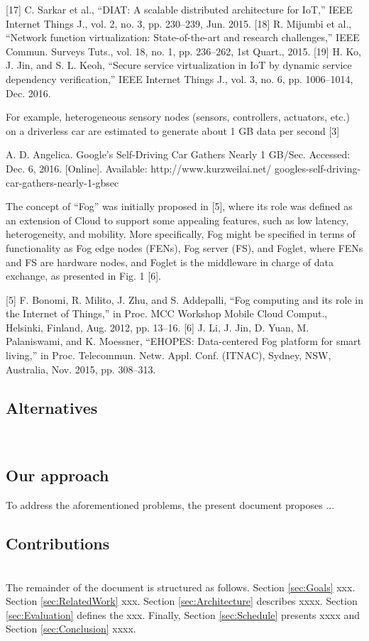 [17] C. Sarkar et al., “DIAT: A scalable distributed architecture for IoT,”
IEEE Internet Things J., vol. 2, no. 3, pp. 230–239, Jun. 2015.
[18] R. Mijumbi et al., “Network function virtualization: State-of-the-art
and research challenges,” IEEE Commun. Surveys Tuts., vol. 18, no. 1,
pp. 236–262, 1st Quart., 2015.
[19] H. Ko, J. Jin, and S. L. Keoh, “Secure service virtualization in IoT
by dynamic service dependency verification,” IEEE Internet Things J.,
vol. 3, no. 6, pp. 1006–1014, Dec. 2016.

For example, heterogeneous sensory
nodes (sensors, controllers, actuators, etc.) on a driverless car
are estimated to generate about 1 GB data per second [3]

A. D. Angelica. Google’s Self-Driving Car Gathers Nearly 1 GB/Sec.
Accessed: Dec. 6, 2016. [Online]. Available: http://www.kurzweilai.net/
googles-self-driving-car-gathers-nearly-1-gbsec


The concept of “Fog” was initially proposed in [5], where
its role was defined as an extension of Cloud to support some
appealing features, such as low latency, heterogeneity, and
mobility. More specifically, Fog might be specified in terms
of functionality as Fog edge nodes (FENs), Fog server (FS),
and Foglet, where FENs and FS are hardware nodes, and
Foglet is the middleware in charge of data exchange, as
presented in Fig. 1 [6].

[5] F. Bonomi, R. Milito, J. Zhu, and S. Addepalli, “Fog computing and its
role in the Internet of Things,” in Proc. MCC Workshop Mobile Cloud
Comput., Helsinki, Finland, Aug. 2012, pp. 13–16.
[6] J. Li, J. Jin, D. Yuan, M. Palaniswami, and K. Moessner, “EHOPES:
Data-centered Fog platform for smart living,” in Proc. Telecommun.
Netw. Appl. Conf. (ITNAC), Sydney, NSW, Australia, Nov. 2015,
pp. 308–313.



\subsection{Alternatives}
\noindent\tab [Alternatives]\\

\subsection{Our approach}
\noindent\tab To address the aforementioned problems, the present document proposes ...\\

\subsection{Contributions}
\noindent\tab [Contributions]\\
\noindent\tab The remainder of the document is structured as follows. Section \ref{sec:Goals} xxx. Section \ref{sec:RelatedWork} xxx. Section \ref{sec:Architecture} describes xxxx. Section \ref{sec:Evaluation} defines the xxx. Finally, Section \ref{sec:Schedule} presents xxxx and Section \ref{sec:Conclusion} xxxx.


